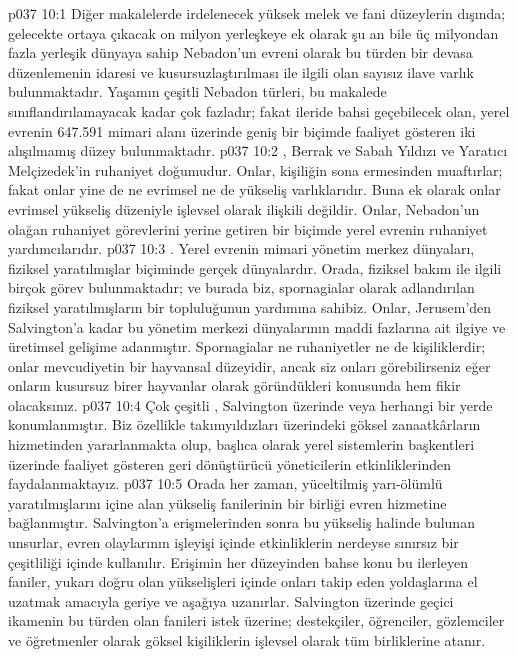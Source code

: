 \vs p037 10:1 Diğer makalelerde irdelenecek yüksek melek ve fani düzeylerin dışında; gelecekte ortaya çıkacak on milyon yerleşkeye ek olarak şu an bile üç milyondan fazla yerleşik dünyaya sahip Nebadon’un evreni olarak bu türden bir devasa düzenlemenin idaresi ve kusursuzlaştırılması ile ilgili olan sayısız ilave varlık bulunmaktadır. Yaşamın çeşitli Nebadon türleri, bu makalede sınıflandırılamayacak kadar çok fazladır; fakat ileride bahsi geçebilecek olan, yerel evrenin 647.591 mimari alanı üzerinde geniş bir biçimde faaliyet gösteren iki alışılmamış düzey bulunmaktadır.
\vs p037 10:2 , Berrak ve Sabah Yıldızı ve Yaratıcı Melçizedek’in ruhaniyet doğumudur. Onlar, kişiliğin sona ermesinden muaftırlar; fakat onlar yine de ne evrimsel ne de yükseliş varlıklarıdır. Buna ek olarak onlar evrimsel yükseliş düzeniyle işlevsel olarak ilişkili değildir. Onlar, Nebadon’un olağan ruhaniyet görevlerini yerine getiren bir biçimde yerel evrenin ruhaniyet yardımcılarıdır.
\vs p037 10:3 . Yerel evrenin mimari yönetim merkez dünyaları, fiziksel yaratılmışlar biçiminde gerçek dünyalardır. Orada, fiziksel bakım ile ilgili birçok görev bulunmaktadır; ve burada biz, spornagialar olarak adlandırılan fiziksel yaratılmışların bir topluluğunun yardımına sahibiz. Onlar, Jerusem’den Salvington'a kadar bu yönetim merkezi dünyalarının maddi fazlarına ait ilgiye ve üretimsel gelişime adanmıştır. Spornagialar ne ruhaniyetler ne de kişiliklerdir; onlar mevcudiyetin bir hayvansal düzeyidir, ancak siz onları görebilirseniz eğer onların kusursuz birer hayvanlar olarak göründükleri konusunda hem fikir olacaksınız.
\vs p037 10:4 Çok çeşitli , Salvington üzerinde veya herhangi bir yerde konumlanmıştır. Biz özellikle takımyıldızları üzerindeki göksel zanaatkârların hizmetinden yararlanmakta olup, başlıca olarak yerel sistemlerin başkentleri üzerinde faaliyet gösteren geri dönüştürücü yöneticilerin etkinliklerinden faydalanmaktayız.
\vs p037 10:5 Orada her zaman, yüceltilmiş yarı\hyp{}ölümlü yaratılmışlarını içine alan yükseliş fanilerinin bir birliği evren hizmetine bağlanmıştır. Salvington’a erişmelerinden sonra bu yükseliş halinde bulunan unsurlar, evren olaylarının işleyişi içinde etkinliklerin nerdeyse sınırsız bir çeşitliliği içinde kullanılır. Erişimin her düzeyinden bahse konu bu ilerleyen faniler, yukarı doğru olan yükselişleri içinde onları takip eden yoldaşlarına el uzatmak amacıyla geriye ve aşağıya uzanırlar. Salvington üzerinde geçici ikamenin bu türden olan fanileri istek üzerine; destekçiler, öğrenciler, gözlemciler ve öğretmenler olarak göksel kişiliklerin işlevsel olarak tüm birliklerine atanır.
